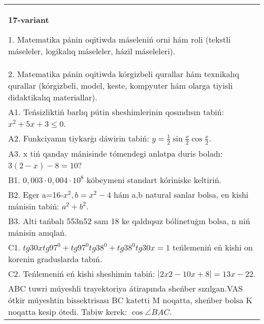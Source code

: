 \documentclass{article}
\begin{document}
\begin{tabular}{m{17cm}}
\textbf{17-variant}

1. Matematika pánin oqitiwda máseleniń orni hám roli (tekstli máseleler, logikalıq máseleler, házil máseleleri). \\
2. Matematika pánin oqitiwda kórgizbeli qurallar hám texnikalıq qurallar (kórgizbeli, model, keste, kompyuter hám olarga tiyisli didaktikalıq materiallar). \\
A1. Teńsizliktiń barlıq pútin sheshimlerinin qosındısın tabiń: \(x^2 + 5x + 3 \leq 0\). \\
A2. Funkciyanın tiykarģı dáwirin tabiń: \(y = \frac{1}{2}\sin{\frac{x}{2}\cos\frac{x}{2}}\). \\
A3. x tiń qanday mánisinde tómendegi anlatpa duris boladı: \(3 (2 - x) - 8 = 10\)? \\
B1. \(0,003 \cdot 0,004 \cdot 10^{8}\) kóbeymeni standart kóriniske keltiriń. \\
B2. Eger a=16-\(x^2, b=x^2 - 4\) hám a,b natural sanlar bolsa, en kishi mánisin tabiń: \(a^2 + b^2\). \\
B3. Alti tańbalı 553n52 sanı 18 ke qaldıqsız bólinetuģın bolsa, n niń mánisin anıqlań. \\
C1. \(tg30xtg97^{0} + tg97^{0}tg38^{0} + tg38^{0}tg30x = 1\) teńlemeniń eń kishi on korenin graduslarda tabıń. \\
C2. Teńlemeniń eń kishi sheshimin tabiń: \(\left| 2x2 - 10x + 8 \right| = 13x - 22\). \\
ABC tuwri múyeshli trayektoriya átirapında sheńber sızılgan.VAS ótkir múyeshtin bissektrisası BC katetti M noqatta, sheńber bolsa K noqatta kesip ótedi. Tabiw kerek: \(\cos\angle BAC\). \\

\end{tabular}
\vspace{1cm}
\end{document}
